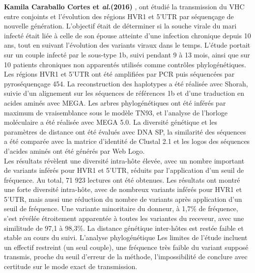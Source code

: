 \documentclass[a4paper,12pt]{article}
\begin{document}
 \textbf{Kamila Caraballo Cortes et \textit{al.}(2016)}  \cite{cortesSpousetoSpouseTransmissionEvolution2016}, ont étudié la transmission du VHC entre conjoints et l’évolution des régions HVR1 et 5'UTR par séquençage de nouvelle génération. L’objectif était de déterminer si la souche virale du mari infecté était liée à celle de son épouse atteinte d’une infection chronique depuis 10 ans, tout en suivant l’évolution des variants viraux dans le temps. L’étude portait sur un couple infecté par le sous-type 1b, suivi pendant 9 à 13 mois, ainsi que sur 10 patients chroniques non apparentés utilisés comme contrôles phylogénétiques. Les régions HVR1 et 5'UTR ont été amplifiées par PCR puis séquencées par pyroséquençage 454. La reconstruction des haplotypes a été réalisée avec Shorah, suivie d’un alignement sur les séquences de références 1b et d’une traduction en acides aminés avec MEGA. Les arbres phylogénétiques ont été inférés par maximum de vraisemblance sous le modèle TN93, et l’analyse de l’horloge moléculaire a été réalisée avec MEGA 5.0. La diversité génétique et les paramètres de distance ont été évalués avec DNA SP, la similarité des séquences a été comparée avec la matrice d'identité de Clustal 2.1 et les logos des séquences d'acides aminés ont été générés par Web Logo. \\
 Les résultats révèlent une diversité intra-hôte élevée, avec un nombre important de variants inférés pour HVR1 et 5'UTR, réduits par l’application d’un seuil de fréquence. Au total, 71 923 lectures ont été obtenues. Les résultats ont montré une forte diversité intra-hôte, avec de nombreux variants inférés pour HVR1 et 5'UTR, mais aussi une réduction du nombre de variants après application d’un seuil de fréquence. Une variante minoritaire du donneur, à 1,7\% de fréquence, s’est révélée étroitement apparentée à toutes les variantes du receveur, avec une similitude de 97,1 à 98,3\%. La distance génétique inter-hôtes est restée faible et stable au cours du suivi. L’analyse phylogénétique 
Les limites de l’étude incluent un effectif restreint (un seul couple), une fréquence très faible du variant supposé transmis, proche du seuil d’erreur de la méthode, l’impossibilité de conclure avec certitude sur le mode exact de transmission. \\
\end{document}
